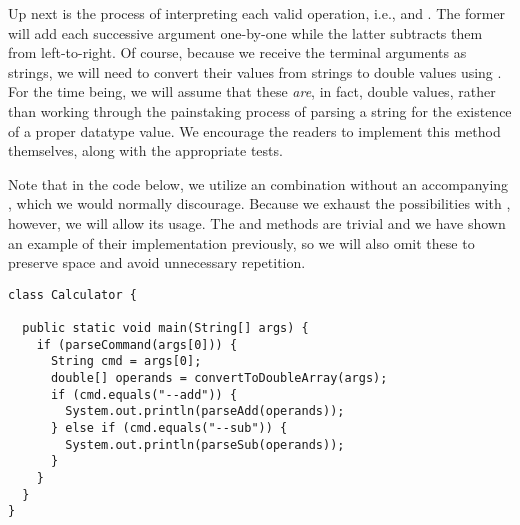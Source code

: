 Up next is the process of interpreting each valid operation, i.e.,  and . The former will add each successive argument one-by-one while the latter subtracts them from left-to-right. Of course, because we receive the terminal arguments as strings, we will need to convert their values from strings to double values using . For the time being, we will assume that these \emph{are}, in fact, double values, rather than working through the painstaking process of parsing a string for the existence of a proper  datatype value. We encourage the readers to implement this method themselves, along with the appropriate tests.

Note that in the code below, we utilize an  combination without an accompanying , which we would normally discourage. Because we exhaust the possibilities with , however, we will allow its usage. The  and  methods are trivial and we have shown an example of their implementation previously, so we will also omit these to preserve space and avoid unnecessary repetition.

\begin{lstlisting}[language=MyJava]
class Calculator {

  public static void main(String[] args) {
    if (parseCommand(args[0])) {
      String cmd = args[0];
      double[] operands = convertToDoubleArray(args);
      if (cmd.equals("--add")) {
        System.out.println(parseAdd(operands));
      } else if (cmd.equals("--sub")) {
        System.out.println(parseSub(operands));
      }
    }
  }
}
\end{lstlisting}



